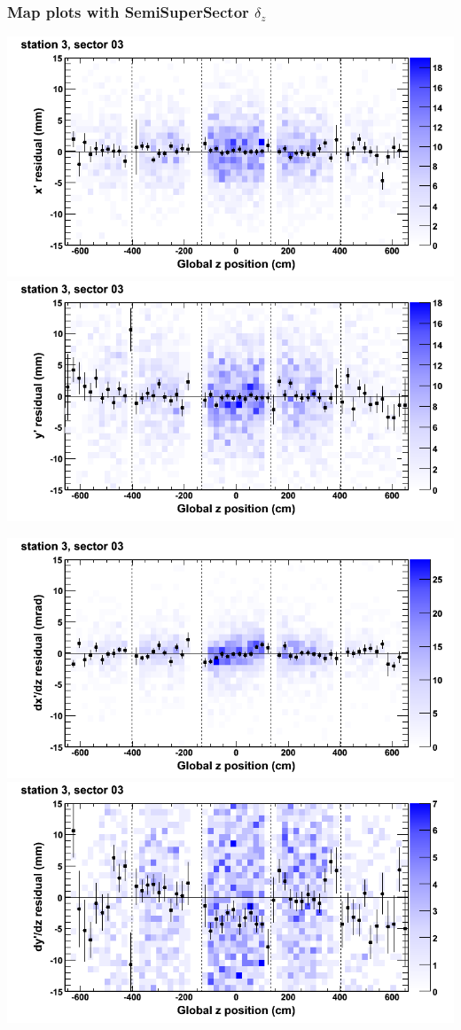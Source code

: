 \documentclass[compress]{beamer}
\begin{document}
\begin{frame}
\frametitle{Map plots with SemiSuperSector $\delta_z$}
\includegraphics[width=0.5\linewidth]{zfit_mapplots/DTvsz_st3sec03_x.png}
\includegraphics[width=0.5\linewidth]{zfit_mapplots/DTvsz_st3sec03_y.png}

\includegraphics[width=0.5\linewidth]{zfit_mapplots/DTvsz_st3sec03_dxdz.png}
\includegraphics[width=0.5\linewidth]{zfit_mapplots/DTvsz_st3sec03_dydz.png}
\end{frame}
\end{document}
